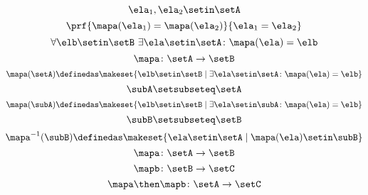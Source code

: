 \begin{forslides}
    \begin{equation}
        \label{eq:slides_session2_122}
        \ela_1, \ela_2 \setin\setA
    \end{equation}
    \begin{equation}
        \label{eq:slides_session2_123}
        \prf{\mapa(\ela_1) = \mapa(\ela_2)}{\ela_1 = \ela_2}
    \end{equation}
    \begin{equation}
        \label{eq:slides_session2_124}
        \forall \elb \setin\setB \ \exists  \ela \setin\setA \colon \mapa(\ela) = \elb
    \end{equation}
    \begin{equation}
        \label{eq:slides_session2_125}
        \mapa\colon \setA \to \setB
    \end{equation}
    \begin{equation}
        \label{eq:slides_session2_126}
        \mapa(\setA) \definedas \makeset{ \elb \setin\setB \mid \exists \ela \setin\setA \colon \mapa(\ela) = \elb }
    \end{equation}
    \begin{equation}
        \label{eq:slides_session2_127}
        \subA \setsubseteq \setA
    \end{equation}
    \begin{equation}
        \label{eq:slides_session2_128}
        \mapa(\subA) \definedas \makeset{ \elb \setin\setB \mid \exists \ela \setin \subA \colon \mapa(\ela) = \elb }
    \end{equation}
    \begin{equation}
        \label{eq:slides_session2_129}
        \subB \setsubseteq \setB
    \end{equation}
    \begin{equation}
        \label{eq:slides_session2_130}
        \mapa^{-1}(\subB) \definedas \makeset{ \ela \setin\setA \mid  \mapa(\ela) \setin \subB}
    \end{equation}
    \begin{equation}
        \label{eq:slides_session2_131}
        \mapa\colon \setA \to \setB
    \end{equation}
    \begin{equation}
        \label{eq:slides_session2_132}
        \mapb \colon \setB \to \setC
    \end{equation}
    \begin{equation}
        \label{eq:slides_session2_133}
        \mapa \then \mapb \colon \setA \to \setC
    \end{equation}

\end{forslides}
